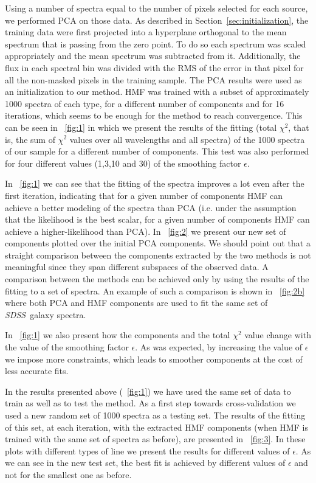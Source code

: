 \documentclass[12pt,preprint]{aastex}
\newcommand{\project}[1]{\textsl{#1}}
\newcommand{\sdss}{\project{SDSS}}
\newcommand{\SDSS}{\sdss}
\newcommand{\sectionname}{Section}
\begin{document}
Using a number of spectra equal to the number of pixels selected for
each source, we performed PCA on those data. As described in 
\sectionname~\ref{sec:initialization}, the training data were
first projected into a hyperplane orthogonal to the mean
spectrum that is passing from the zero point. To do so each spectrum 
was scaled appropriately and the mean spectrum was subtracted from it. 
Additionally, the flux in each spectral bin was divided
with the RMS of the error in that pixel for all the non-masked pixels in
the training sample. The PCA results were used as an initialization to
our method. HMF was trained with a subset of approximately 1000
spectra of each type, for a different number of components and for 16
iterations, which seems to be enough for the method to reach convergence. This
can be seen in \figurename~\ref{fig:1} in which we present the results of
the fitting (total $\chi^2$, that is, the sum of $\chi^2$ values over all
wavelengths and all spectra) of the 1000 spectra of our sample for a
different number of components. This test was also performed for four
different values (1,3,10 and 30) of the smoothing factor $\epsilon$.

In \figurename~\ref{fig:1} we can see that the fitting of the spectra
improves a lot even after the first iteration, indicating that for a 
given number of components HMF can achieve a better modeling of the 
spectra than PCA (i.e. under the assumption that the likelihood is the best 
scalar, for a given number of components HMF can achieve a higher-likelihood than PCA). 
In \figurename~\ref{fig:2} 
we present our new set of components plotted over the
initial PCA components. We should point out that a straight comparison
between the components extracted by the two methods is not meaningful
since they span different subspaces of the observed data. A 
comparison between the methods can be achieved only by using
the results of the fitting to a set of spectra. An example of such a 
comparison is shown in \figurename~\ref{fig:2b} where both PCA and HMF 
components are used to fit the same set of \SDSS\ galaxy spectra.

In \figurename~\ref{fig:1} we also present how the components and the
total $\chi^2$ value change with the value of the smoothing factor
$\epsilon$. As was expected, by increasing the value of $\epsilon$ we 
impose more constraints, which leads to smoother components at the 
cost of less accurate fits. 

In the results presented above (\figurename~\ref{fig:1}) we have used
the same set of data to train as well as to test the method. As a
first step towards cross-validation we used a new random set of 1000
spectra as a testing set. The results of the fitting of this set, at
each iteration, with the extracted HMF components (when HMF is 
trained with the same set of spectra as before), are presented in
\figurename~\ref{fig:3}. In these plots with different types of line
we present the results for different values of $\epsilon$. As we can
see in the new test set, the best fit is achieved by different values
of $\epsilon$ and not for the smallest one as before.
\end{document}

